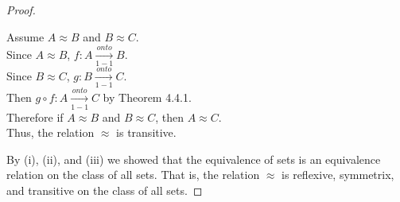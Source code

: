 \documentclass[a4paper,11pt]{article}
\begin{document}
\begin{theorem1}
\begin{proof}
\begin{enumerate}[(i)]
      Assume \(A \approx B\) and \(B \approx C\).\\
      Since \(A \approx B\), \(f:A \xrightarrow[1-1]{onto} B\).\\
      Since \(B \approx C\), \(g:B \xrightarrow[1-1]{onto} C\).\\
      Then \(g \circ f:A \xrightarrow[1-1]{onto} C \) by Theorem 4.4.1.\\
      Therefore if \(A \approx B\) and \(B \approx C\), then \(A \approx C\).\\
      Thus, the relation \(\approx\) is transitive.
    \end{enumerate}
    \noindent By {(i)}, {(ii)}, and {(iii)} we showed that the equivalence of sets is an equivalence relation on the class of all sets. That is, the relation \(\approx\) is 
    reflexive, symmetrix, and transitive on the class of all sets.
  \end{proof}
\end{theorem1}
\newpage
\setcounter{ProblemCounter}{4}
\end{document}
